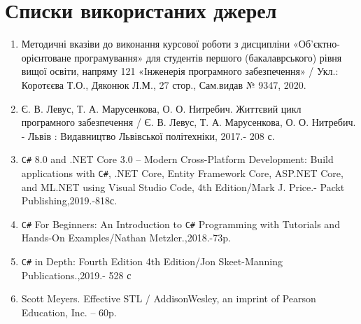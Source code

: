 \documentclass[14pt]{extarticle}
\begin{document}
\section{Списки використаних джерел}
\begin{enumerate}
    \item Методичні вказіви до виконання курсової роботи з дисципліни «Об'єктно-орієнтоване програмування» для студентів першого (бакалаврського) рівня вищої освіти, напряму 121 «Інженерія програмного забезпечення» / Укл.: Коротєєва Т.О., Дяконюк Л.М., 27 стор., Сам.видав № 9347, 2020.
    
    \item Є. В. Левус, Т. А. Марусенкова, О. О. Нитребич. Життєвий цикл   
програмного забезпечення / Є. В. Левус, Т. А. Марусенкова, О. О. 
Нитребич. - Львів : Видавництво Львівської політехніки, 2017.-  208 с.
    \item \verb*|C#| 8.0 and .NET Core 3.0 – Modern Cross-Platform Development: Build applications with \verb|C#|, .NET Core, Entity Framework Core, ASP.NET Core, and ML.NET using Visual Studio Code, 4th Edition/Mark J. Price.- Packt Publishing,2019.-818с.
    \item \verb|С#| For Beginners: An Introduction to \verb|C#| Programming with Tutorials and Hands-On Examples/Nathan Metzler.,2018.-73p.
    \item \verb|C#| in Depth: Fourth Edition 4th Edition/Jon Skeet-Manning Publications.,2019.- 528 с
    \item Scott Meyers. Effective STL / AddisonWesley, an imprint of Pearson Education, Inc. – 60p. 
\end{enumerate}
\end{document}
